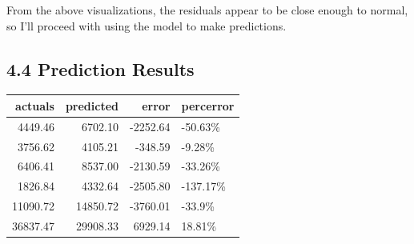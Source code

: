 \documentclass[]{article}
\newenvironment{Shaded}{\begin{snugshade}}{\end{snugshade}}
\newcommand{\KeywordTok}[1]{\textcolor[rgb]{0.13,0.29,0.53}{\textbf{#1}}}
\newcommand{\DataTypeTok}[1]{\textcolor[rgb]{0.13,0.29,0.53}{#1}}
\newcommand{\DecValTok}[1]{\textcolor[rgb]{0.00,0.00,0.81}{#1}}
\newcommand{\StringTok}[1]{\textcolor[rgb]{0.31,0.60,0.02}{#1}}
\newcommand{\OperatorTok}[1]{\textcolor[rgb]{0.81,0.36,0.00}{\textbf{#1}}}
\newcommand{\NormalTok}[1]{#1}
\begin{document}
From the above visualizations, the residuals appear to be close enough
to normal, so I'll proceed with using the model to make predictions.

\subsection{4.4 Prediction Results}\label{prediction-results}

\begin{Shaded}
\end{Shaded}

\begin{longtable}[]{@{}rrrl@{}}
\toprule
actuals & predicted & error & percerror\tabularnewline
\midrule
\endhead
4449.46 & 6702.10 & -2252.64 & -50.63\%\tabularnewline
3756.62 & 4105.21 & -348.59 & -9.28\%\tabularnewline
6406.41 & 8537.00 & -2130.59 & -33.26\%\tabularnewline
1826.84 & 4332.64 & -2505.80 & -137.17\%\tabularnewline
11090.72 & 14850.72 & -3760.01 & -33.9\%\tabularnewline
36837.47 & 29908.33 & 6929.14 & 18.81\%\tabularnewline
\bottomrule
\end{longtable}

\begin{Shaded}
\end{Shaded}
\end{document}
